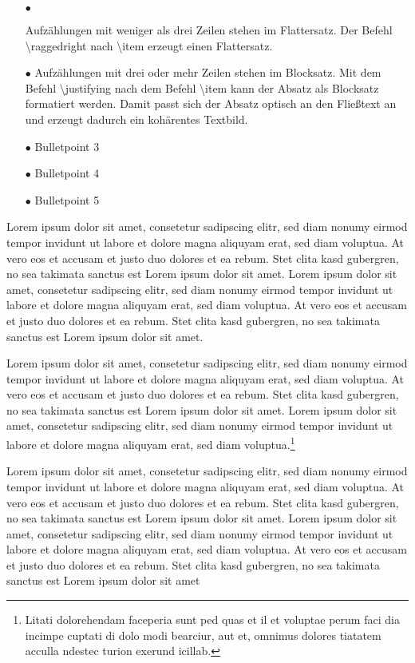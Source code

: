 \begin{itemize}
\label{itm:BeispielItemize}
\item[$\bullet$] \raggedright Aufzählungen mit weniger als drei Zeilen stehen im Flattersatz. Der Befehl \glqq \textbackslash raggedright\grqq{} nach \glqq \textbackslash item\grqq{} erzeugt einen Flattersatz.
\item[$\bullet$] \justifying Aufzählungen mit drei oder mehr Zeilen stehen im Blocksatz. Mit dem Befehl \glqq \textbackslash justifying\grqq{} nach dem Befehl \glqq \textbackslash item\grqq{} kann der Absatz als Blocksatz formatiert werden. Damit passt sich der Absatz optisch an den Fließtext an und erzeugt dadurch ein kohärentes Textbild.
\item[$\bullet$] Bulletpoint 3
\item[$\bullet$] Bulletpoint 4
\item[$\bullet$] Bulletpoint 5
\end{itemize}

Lorem ipsum dolor sit amet, consetetur sadipscing elitr, sed diam nonumy eirmod tempor invidunt ut labore et dolore magna aliquyam erat, sed diam voluptua. At vero eos et accusam et justo duo dolores et ea rebum. Stet clita kasd gubergren, no sea takimata sanctus est Lorem ipsum dolor sit amet. Lorem ipsum dolor sit amet, consetetur sadipscing elitr, sed diam nonumy eirmod tempor invidunt ut labore et dolore magna aliquyam erat, sed diam voluptua. At vero eos et accusam et justo duo dolores et ea rebum. Stet clita kasd gubergren, no sea takimata sanctus est Lorem ipsum dolor sit amet.

Lorem ipsum dolor sit amet, consetetur sadipscing elitr, sed diam nonumy eirmod tempor invidunt ut labore et dolore magna aliquyam erat, sed diam voluptua. At vero eos et accusam et justo duo dolores et ea rebum. Stet clita kasd gubergren, no sea takimata sanctus est Lorem ipsum dolor sit amet. Lorem ipsum dolor sit amet, consetetur sadipscing elitr, sed diam nonumy eirmod tempor invidunt ut labore et dolore magna aliquyam erat, sed diam voluptua.\footnote{Litati dolorehendam faceperia sunt ped quas et il et voluptae perum faci dia incimpe cuptati di dolo modi bearciur, aut et, omnimus dolores tiatatem acculla ndestec turion exerund icillab.}

Lorem ipsum dolor sit amet, consetetur sadipscing elitr, sed diam nonumy eirmod tempor invidunt ut labore et dolore magna aliquyam erat, sed diam voluptua. At vero eos et accusam et justo duo dolores et ea rebum. Stet clita kasd gubergren, no sea takimata sanctus est Lorem ipsum dolor sit amet. Lorem ipsum dolor sit amet, consetetur sadipscing elitr, sed diam nonumy eirmod tempor invidunt ut labore et dolore magna aliquyam erat, sed diam voluptua. At vero eos et accusam et justo duo dolores et ea rebum. Stet clita kasd gubergren, no sea takimata sanctus est Lorem ipsum dolor sit amet

